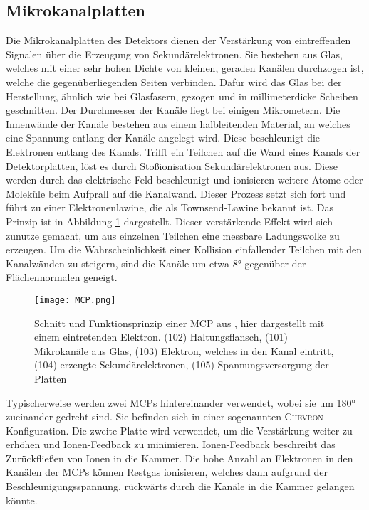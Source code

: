 \subsection{Mikrokanalplatten}
Die Mikrokanalplatten des Detektors dienen der Verstärkung von eintreffenden Signalen über die Erzeugung von Sekundärelektronen. Sie bestehen aus Glas, welches mit einer sehr hohen Dichte von kleinen, geraden Kanälen durchzogen ist, welche die gegenüberliegenden Seiten verbinden. Dafür wird das Glas bei der Herstellung, ähnlich wie bei Glasfasern, gezogen und in millimeterdicke Scheiben geschnitten. Der Durchmesser der Kanäle liegt bei einigen Mikrometern. Die Innenwände der Kanäle bestehen aus einem halbleitenden Material, an welches eine Spannung entlang der Kanäle angelegt wird. Diese beschleunigt die Elektronen entlang des Kanals. Trifft ein Teilchen auf die Wand eines Kanals der Detektorplatten, löst es durch Stoßionisation Sekundärelektronen aus. Diese werden durch das elektrische Feld beschleunigt und ionisieren weitere Atome oder Moleküle beim Aufprall auf die Kanalwand. Dieser Prozess setzt sich fort und führt zu einer Elektronenlawine, die als Townsend-Lawine bekannt ist. Das Prinzip ist in Abbildung \ref{fig:MCP} dargestellt. Dieser verstärkende Effekt wird sich zunutze gemacht, um aus einzelnen Teilchen eine messbare Ladungswolke zu erzeugen. Um die Wahrscheinlichkeit einer Kollision einfallender Teilchen mit den Kanalwänden zu steigern, sind die Kanäle um etwa \ang{8} gegenüber der Flächennormalen geneigt. 

\begin{figure}
    \centering
    \texttt{[image: MCP.png]}
    \caption[Schnitt und Funktionsprinzip einer MCP]{Schnitt und Funktionsprinzip einer MCP aus \cite{MCP}, hier dargestellt mit einem eintretenden Elektron. (102) Haltungsflansch, (101) Mikrokanäle aus Glas, (103) Elektron, welches in den Kanal eintritt, (104) erzeugte Sekundärelektronen, (105) Spannungsversorgung der Platten}
    \label{fig:MCP} 
\end{figure}

Typischerweise werden zwei MCPs hintereinander verwendet, wobei sie um \ang{180} zueinander gedreht sind. Sie befinden sich in einer sogenannten \textsc{Chevron}-Konfiguration. Die zweite Platte wird verwendet, um die Verstärkung weiter zu erhöhen und Ionen-Feedback zu minimieren. Ionen-Feedback beschreibt das Zurückfließen von Ionen in die Kammer. Die hohe Anzahl an Elektronen in den Kanälen der MCPs können Restgas ionisieren, welches dann aufgrund der Beschleunigungsspannung, rückwärts durch die Kanäle in die Kammer gelangen könnte. 

